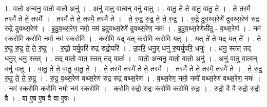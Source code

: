 \documentclass[17pt]{extarticle}
\begin{document}
1. वातो॒ अन्वनु॒ वातो॒ वातो॒ अनु॑ । . अनु॑ वातु वा॒त्वन् वनु॑ वातु । . वा॒तु॒ ते॒ ते॒ वा॒तु॒ वा॒तु॒ ते॒ । . ते॒ तस्मै॒ तस्मै॑ ते ते॒ तस्मै᳚ । . तस्मै॑ ते ते॒ तस्मै॒ तस्मै॑ ते । . ते॒ रु॒द्र॒ रु॒द्र॒ ते॒ ते॒ रु॒द्र॒ । . रु॒द्रे॒ दु॒व॒थ्स॒रेणे॑ दुवथ्स॒रेण॑ रुद्र रुद्रे दुवथ्स॒रेण॑ । . इ॒दु॒व॒थ्स॒रेण॒ नमो॒ नम॑ इदुवथ्स॒रेणे॑ दुवथ्स॒रेण॒ नमः॑ । . इ॒दु॒व॒थ्स॒रेणेती॑दु - व॒थ्स॒रेण॑ । . नम॑ स्करोमि करोमि॒ नमो॒ नम॑ स्करोमि । . क॒रो॒मि॒ यद् यत् क॑रोमि करोमि॒ यत् । . यत् ते॑ ते॒ यद् यत् ते᳚ । . ते॒ रु॒द्र॒ रु॒द्र॒ ते॒ ते॒ रु॒द्र॒ । . रु॒द्रो॒ पर्यु॒परि॑ रुद्र रुद्रो॒परि॑ । . उ॒परि॒ धनु॒र् धनु॑ रु॒पर्यु॒परि॒ धनुः॑ । . धनु॒ स्तत् तद् धनु॒र् धनु॒ स्तत् । . तद् वातो॒ वात॒ स्तत् तद् वातः॑ । . वातो॒ अन्वनु॒ वातो॒ वातो॒ अनु॑ । . अनु॑ वातु वा॒त्वन् वनु॑ वातु । . वा॒तु॒ ते॒ ते॒ वा॒तु॒ वा॒तु॒ ते॒ । . ते॒ तस्मै॒ तस्मै॑ ते ते॒ तस्मै᳚ । . तस्मै॑ ते ते॒ तस्मै॒ तस्मै॑ ते । . ते॒ रु॒द्र॒ रु॒द्र॒ ते॒ ते॒ रु॒द्र॒ । . रु॒द्र॒ व॒थ्स॒रेण॑ वथ्स॒रेण॑ रुद्र रुद्र वथ्स॒रेण॑ । . व॒थ्स॒रेण॒ नमो॒ नमो॑ वथ्स॒रेण॑ वथ्स॒रेण॒ नमः॑ । . नम॑ स्करोमि करोमि॒ नमो॒ नम॑ स्करोमि । . क॒रो॒मि॒ रु॒द्रो रु॒द्रः क॑रोमि करोमि रु॒द्रः । . रु॒द्रो वै वै रु॒द्रो रु॒द्रो वै । . वा ए॒ष ए॒ष वै वा ए॒षः । \newline
\end{document}
